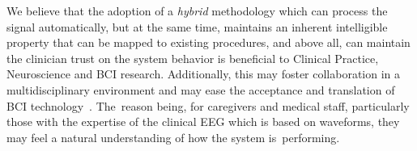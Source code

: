 \documentclass[brainsci,article,accept,moreauthors,pdftex,10pt,a4paper]{mdpi}
\begin{document}



We believe that the adoption of a \textit{hybrid} methodology which can process the signal automatically, but at the same time, maintains an inherent intelligible property that can be mapped to existing procedures, and above all, can maintain the clinician trust on the system behavior is beneficial to Clinical Practice, Neuroscience and BCI research.  Additionally, this may foster collaboration in a multidisciplinary environment and may ease the acceptance and translation of BCI technology~\citep{Chavarriaga2017}.   The~reason being, for caregivers and medical staff, particularly those with the expertise of the clinical EEG which is based on waveforms, they may feel a natural understanding of how the system is~performing.

\end{document}
